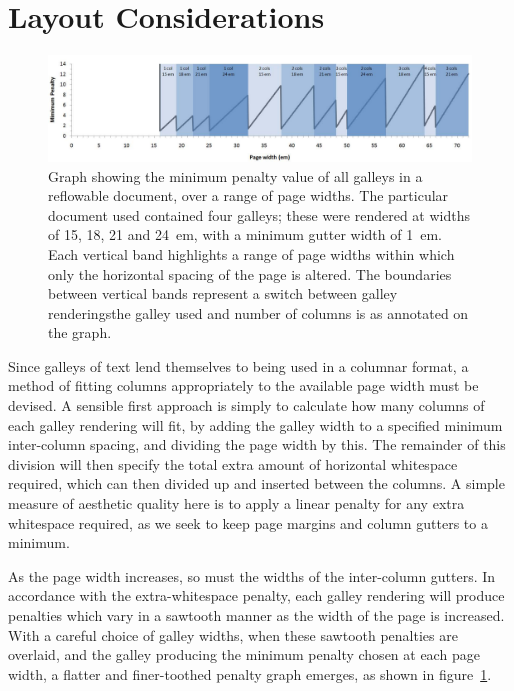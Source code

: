 \section{Layout Considerations}
\begin{figure}
 \includegraphics[width=\textwidth]{gfx/graph-em}
 \caption[Graph of minimum penalty values]{Graph showing the minimum penalty value of all galleys in a reflowable document, over a range of page widths. The particular document used contained four galleys; these were rendered at widths of 15, 18, 21 and 24~em, with a minimum gutter width of 1~em. Each vertical band highlights a range of page widths within which only the horizontal spacing of the page is altered. The boundaries between vertical bands represent a switch between galley renderings\ed{}the galley used and number of columns is as annotated on the graph.}
 \label{fig:penaltygraph}
\end{figure}
Since galleys of text lend themselves to being used in a columnar format, a method of fitting columns appropriately to the available page width must be devised. A sensible first approach is simply to calculate how many columns of each galley rendering will fit, by adding the galley width to a specified minimum inter-column spacing, and dividing the page width by this. The remainder of this division will then specify the total extra amount of horizontal whitespace required, which can then divided up and inserted between the columns. A simple measure of aesthetic quality here is to apply a linear penalty for any extra whitespace required, as we seek to keep page margins and column gutters to a minimum.


As the page width increases, so must the widths of the inter-column gutters. In accordance with the extra-whitespace penalty, each galley rendering will produce penalties which vary in a sawtooth manner as the width of the page is increased. With a careful choice of galley widths, when these sawtooth penalties are overlaid, and the galley producing the minimum penalty chosen at each page width, a flatter and finer-toothed penalty graph emerges, as shown in figure~\ref{fig:penaltygraph}.

